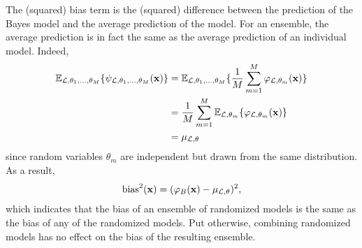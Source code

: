 The (squared) bias term is the (squared) difference between the prediction of the Bayes model
and the average prediction of the model. For an ensemble, the average prediction
is in fact the same as the average prediction of an individual model. Indeed,
\begin{align}
\mathbb{E}_{{\cal L},\theta_1,\dots,\theta_M} \{ \psi_{{\cal L},\theta_1,\dots,\theta_M}(\mathbf{x}) \} &= \mathbb{E}_{{\cal L},\theta_1,\dots,\theta_M} \{ \frac{1}{M} \sum_{m=1}^M \varphi_{{\cal L},\theta_m}(\mathbf{x}) \} \nonumber \\
&= \frac{1}{M} \sum_{m=1}^M \mathbb{E}_{{\cal L},\theta_m} \{ \varphi_{{\cal L},\theta_m}(\mathbf{x}) \} \nonumber \\
&= \mu_{{\cal L},\theta}
\end{align}
since random variables $\theta_m$ are independent but drawn from the
same distribution. As a result,
\begin{equation}
\text{bias}^2(\mathbf{x}) = (\varphi_B(\mathbf{x}) - \mu_{{\cal L},\theta})^2,
\end{equation}
which indicates that the bias of an ensemble of randomized models is the same
as the bias of any of the randomized models. Put otherwise, combining
randomized models has no effect on the bias of the resulting ensemble.

